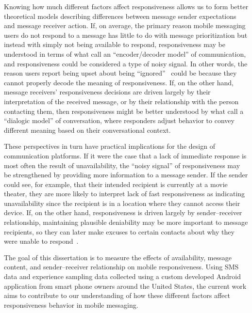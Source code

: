 \documentclass[12pt]{nuthesis}	%
\begin{document}
Knowing how much different factors affect responsiveness allows us to form better theoretical models describing differences between message sender expectations and message receiver action. If, on average, the primary reason mobile messaging users do not respond to a message has little to do with message prioritization but instead with simply not being available to respond, responsiveness may be understood in terms of what \citet{krauss1996social} call an ``encoder/decoder model'' of communication, and responsiveness could be considered a type of noisy signal. In other words, the reason users report being upset about being ``ignored''~\citep{church2013s} could be because they cannot properly decode the meaning of responsiveness. If, on the other hand, message receivers' responsiveness decisions are driven largely by their interpretation of the received message, or by their relationship with the person contacting them, then responsiveness might be better understood by what \citet{krauss1996social} call a ``dialogic model'' of conversation, where responders adjust behavior to convey different meaning based on their conversational context.

These perspectives in turn have practical implications for the design of communication platforms. If it were the case that a lack of immediate response is most often the result of unavailability, the ``noisy signal'' of responsiveness may be strengthened by providing more information to a message sender. If the sender could see, for example, that their intended recipient is currently at a movie theater, they are more likely to interpret lack of fast responsiveness as indicating unavailability since the recipient is in a location where they cannot access their device. If, on the other hand, responsiveness is driven largely by sender--receiver relationship, maintaining plausible deniability may be more important to message recipients, so they can later make excuses to certain contacts about why they were unable to respond~\citep[as in][]{aoki2005making, hancock2009butler}.

The goal of this dissertation is to measure the effects of availability, message content, and sender--receiver relationship on mobile responsiveness. Using SMS data and experience sampling data collected using a custom developed Android application from smart phone owners around the United States, the current work aims to contribute to our understanding of how these different factors affect responsiveness behavior in mobile messaging.
\end{document}
